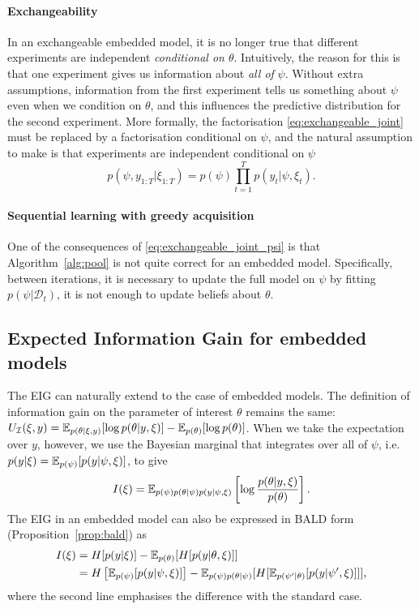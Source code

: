 \documentclass[a4paper, 10pt]{report}
\theoremstyle{plain}
\begin{document}
	\paragraph{Exchangeability}
	In an exchangeable embedded model, it is no longer true that different experiments are independent \emph{conditional on $\theta$}.
	Intuitively, the reason for this is that one experiment gives us information about \emph{all of} $\psi$.
	Without extra assumptions, information from the first experiment tells us something about $\psi$ even when we condition on $\theta$, and this influences the predictive distribution for the second experiment.
	More formally, the factorisation \eqref{eq:exchangeable_joint} must be replaced by a factorisation conditional on $\psi$, and the natural assumption to make is that experiments are independent conditional on $\psi$
	\begin{equation}
	\label{eq:exchangeable_joint_psi}
	p(\psi,y_{1:T}|\xi_{1:T}) = p(\psi)\prod_{t=1}^T p(y_t|\psi,\xi_t).
	\end{equation}
	
	\paragraph{Sequential learning with greedy acquisition}
	One of the consequences of \eqref{eq:exchangeable_joint_psi} is that Algorithm~\ref{alg:pool} is not quite correct for an embedded model.
	Specifically, between iterations, it is necessary to update the full model on $\psi$ by fitting $p(\psi|\mathcal{D}_t)$, it is not enough to update beliefs about $\theta$.
	
	
	
	
	\subsection{Expected Information Gain for embedded models}
	\label{sec:embedded_eig}
	The EIG can naturally extend to the case of embedded models.
	The definition of information gain on the parameter of interest $\theta$ remains the same: $U_\mathcal{I}(\xi,y) = \mathbb{E}_{p(\theta|\xi,y)}[\log p(\theta|y,\xi)] - \mathbb{E}_{p(\theta)}[\log p(\theta)]$.
	When we take the expectation over $y$, however, we use the Bayesian marginal that integrates over all of $\psi$, i.e.~$p(y|\xi) = \mathbb{E}_{p(\psi)}[p(y|\psi,\xi)]$, to give
	\begin{equation}
	I(\xi) = \mathbb{E}_{p(\psi)p(\theta|\psi)p(y|\psi,\xi)}\left[\log \frac{p(\theta|y,\xi)}{p(\theta)} \right].
	\end{equation}
	The EIG in an embedded model can also be expressed in BALD form (Proposition~\ref{prop:bald}) as
	\begin{align}
	I(\xi) &= H[p(y|\xi)] - \mathbb{E}_{p(\theta)}[H[p(y|\theta,\xi)]] \\
	&=H\left[\mathbb{E}_{p(\psi)}[p(y|\psi,\xi)]\right] - \mathbb{E}_{p(\psi)p(\theta|\psi)}[H[\mathbb{E}_{p(\psi'|\theta)}[p(y|\psi',\xi)]]],
	\end{align}
	where the second line emphasises the difference with the standard case.
	
\end{document}
